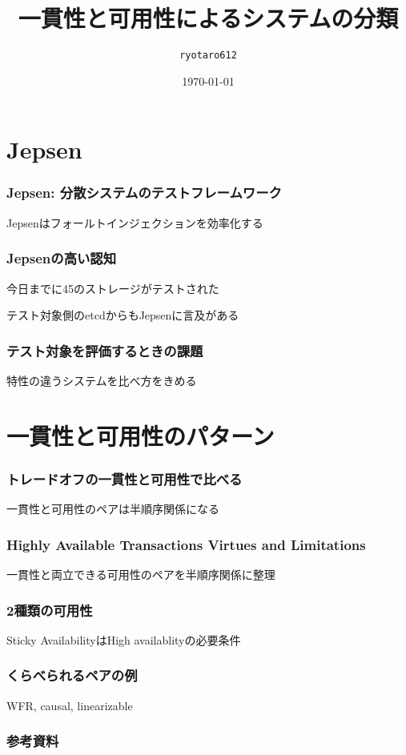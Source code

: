 \documentclass[unicode, 14pt, aspectratio=169]{beamer}
\date{\today}
\title{一貫性と可用性によるシステムの分類}
\author{\texttt{ryotaro612}}
\begin{document}
\begin{frame}
\titlepage
\end{frame}
\section{Jepsen}
\begin{frame}[t]
  \frametitle{Jepsen: 分散システムのテストフレームワーク\cite{jepsen}}
  {\large Jepsenはフォールトインジェクションを効率化する}
\end{frame}
\begin{frame}[t]
  \frametitle{Jepsenの高い認知}
  {\large 今日までに45のストレージがテストされた}
  \par
  テスト対象側のetcdからもJepsenに言及がある
\end{frame}
\begin{frame}[t]
  \frametitle{テスト対象を評価するときの課題}
  {\large 特性の違うシステムを比べ方をきめる}
\end{frame}
\section{一貫性と可用性のパターン}
\begin{frame}[t]
  \frametitle{トレードオフの一貫性と可用性で比べる}
  {\large 一貫性と可用性のペアは半順序関係になる}
\end{frame}
\begin{frame}[t]
  \frametitle{\normalsize{Highly Available Transactions Virtues and Limitations\cite{high}}}
  {\large 一貫性と両立できる可用性のペアを半順序関係に整理}
\end{frame}
\begin{frame}[t]
  \frametitle{2種類の可用性}
  {\large Sticky AvailabilityはHigh availablityの必要条件}
\end{frame}
\begin{frame}[t]
  \frametitle{くらべられるペアの例}
  {\large WFR, causal, linearizable}
\end{frame}
\begin{frame}[allowframebreaks,t]
  \frametitle{参考資料}
  \printbibliography
  \nocite{*}
\end{frame}
\end{document}
